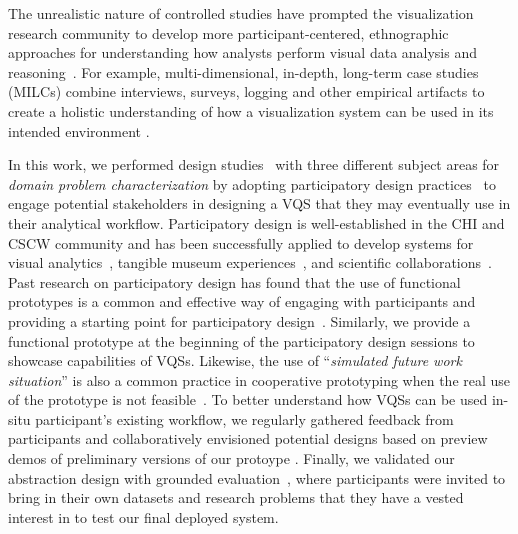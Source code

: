 {  \par The unrealistic nature of controlled studies have prompted the visualization research community to develop more participant-centered, ethnographic approaches for understanding how analysts perform visual data analysis and reasoning~\cite{Plaisant2004,lam2012empirical,shneiderman2006strategies,munzner2009nested,Sedlmair2012}. For example, multi-dimensional, in-depth, long-term case studies (MILCs) combine interviews, surveys, logging and other empirical artifacts to create a holistic understanding of how a visualization system can be used in its intended environment \cite{shneiderman2006strategies}. 
  \par In this work, we performed design studies~\cite{lam2012empirical,shneiderman2006strategies,Sedlmair2012} with three different subject areas for \textit{domain problem characterization} by adopting participatory design practices~\cite{Gould1983,Muller1993} to engage potential stakeholders in designing a VQS that they may eventually use in their analytical workflow. Participatory design is well-established in the CHI and CSCW community and has been successfully applied to develop systems for visual analytics~\cite{Aragon2008,Chuang2012}, tangible museum experiences~\cite{Ciolfi2016}, and scientific collaborations~\cite{Poon2008,Chen2016}. Past research on participatory design has found that the use of functional prototypes is a common and effective way of engaging with participants and providing a starting point for participatory design~\cite{Ciolfi2016}. Similarly, we provide a functional prototype at the beginning of the participatory design sessions to showcase capabilities of VQSs.  Likewise, the use of ``\textit{simulated future work situation}'' is also a common practice in cooperative prototyping when the real use of the prototype is not feasible~\cite{Grnbak1991}. To better understand how VQSs can be used in-situ participant's existing workflow, we regularly gathered feedback from participants and collaboratively envisioned potential designs based on preview demos of preliminary versions of our protoype \zvpp. Finally, we validated our abstraction design with grounded evaluation~\cite{Plaisant2004,Isenberg2008}, where participants were invited to bring in their own datasets and research problems that they have a vested interest in to test our final deployed system.
}
